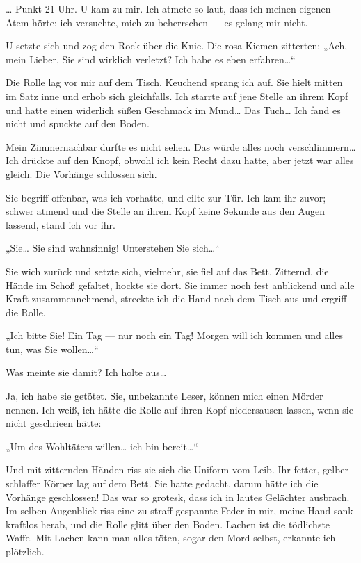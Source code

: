 \ldots{} Punkt 21 Uhr. U kam zu mir. Ich atmete so
laut, dass ich meinen eigenen Atem hörte; ich versuchte, mich zu
beherrschen — es gelang mir nicht.

U setzte sich und zog den Rock
über die Knie. Die rosa Kiemen zitterten:
%
„Ach, mein Lieber, Sie sind wirklich verletzt? Ich habe es eben
erfahren\ldots{}“

Die Rolle lag vor mir auf dem Tisch. Keuchend sprang ich auf. Sie
hielt mitten im Satz inne und erhob sich gleichfalls. Ich starrte
auf jene Stelle an ihrem Kopf und hatte einen widerlich süßen
Geschmack im Mund\ldots{} Das Tuch\ldots{} Ich fand es nicht und spuckte auf
den Boden.

Mein Zimmernachbar durfte es nicht sehen. Das würde
alles noch verschlimmern\ldots{} Ich drückte auf den Knopf, obwohl ich
kein Recht dazu hatte, aber jetzt war alles gleich. Die Vorhänge
schlossen sich.

Sie begriff offenbar, was ich vorhatte, und eilte zur Tür. Ich kam
ihr zuvor; schwer atmend und die Stelle an ihrem Kopf keine Sekunde
aus den Augen lassend, stand ich vor ihr.

„Sie\ldots{} Sie sind wahnsinnig! Unterstehen Sie sich\ldots{}“

Sie wich
zurück und setzte sich, vielmehr, sie fiel auf das Bett. Zitternd,
die Hände im Schoß gefaltet, hockte sie dort. Sie immer noch fest
anblickend und alle Kraft zusammennehmend, streckte ich die Hand
nach dem Tisch aus und ergriff die Rolle.

„Ich bitte Sie! Ein Tag — nur noch ein Tag! Morgen will ich kommen
und alles tun, was Sie wollen\ldots{}“

Was meinte sie damit? Ich holte aus\ldots{}

Ja, ich habe sie getötet. Sie, unbekannte Leser, können mich
einen Mörder nennen. Ich weiß, ich hätte die Rolle auf ihren Kopf
niedersausen lassen, wenn sie nicht geschrieen hätte:

„Um des Wohltäters willen\ldots{} ich bin bereit\ldots{}“

Und mit zitternden Händen riss sie sich die Uniform vom Leib. Ihr
fetter, gelber schlaffer Körper lag auf dem Bett. Sie hatte
gedacht, darum hätte ich die Vorhänge geschlossen! Das war so
grotesk, dass ich in lautes Gelächter ausbrach. Im selben
Augenblick riss eine zu straff gespannte Feder in mir, meine Hand
sank kraftlos herab, und die Rolle glitt über den Boden. Lachen ist
die tödlichste Waffe. Mit Lachen kann man alles töten, sogar den
Mord selbst, erkannte ich plötzlich.

